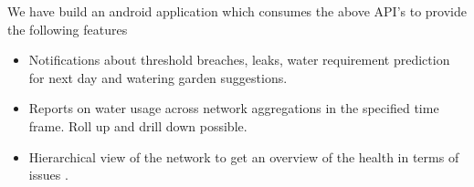 \documentclass[paper=a4, fontsize=11pt]{scrartcl} %
\numberwithin{equation}{section} %
\numberwithin{figure}{section} %
\numberwithin{table}{section} %
\begin{document}
We have build an android application which consumes the above API's to provide the following features
\begin{itemize}
\item Notifications about threshold breaches, leaks, water requirement prediction for next day and watering garden suggestions.
\item Reports on water usage across network aggregations in the specified time frame. Roll up and drill down possible.
\item Hierarchical view of the network to get an overview of the health in terms of issues .
\end{itemize}
\end{document}
